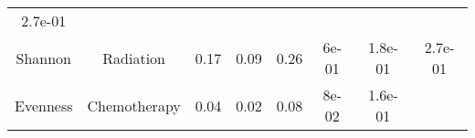 \documentclass[12pt,]{article}
\begin{document}
\begin{longtable}[]{@{}cccccccc@{}}
\begin{minipage}[t]{0.08\columnwidth}
2.7e-01\strut
\end{minipage}\tabularnewline
\begin{minipage}[t]{0.12\columnwidth}\centering\strut
Shannon\strut
\end{minipage} & \begin{minipage}[t]{0.11\columnwidth}\centering\strut
Radiation\strut
\end{minipage} & \begin{minipage}[t]{0.13\columnwidth}\centering\strut
0.17\strut
\end{minipage} & \begin{minipage}[t]{0.08\columnwidth}\centering\strut
0.09\strut
\end{minipage} & \begin{minipage}[t]{0.13\columnwidth}\centering\strut
0.26\strut
\end{minipage} & \begin{minipage}[t]{0.07\columnwidth}\centering\strut
6e-01\strut
\end{minipage} & \begin{minipage}[t]{0.06\columnwidth}\centering\strut
1.8e-01\strut
\end{minipage} & \begin{minipage}[t]{0.08\columnwidth}\centering\strut
2.7e-01\strut
\end{minipage}\tabularnewline
\begin{minipage}[t]{0.12\columnwidth}\centering\strut
Evenness\strut
\end{minipage} & \begin{minipage}[t]{0.11\columnwidth}\centering\strut
Chemotherapy\strut
\end{minipage} & \begin{minipage}[t]{0.13\columnwidth}\centering\strut
0.04\strut
\end{minipage} & \begin{minipage}[t]{0.08\columnwidth}\centering\strut
0.02\strut
\end{minipage} & \begin{minipage}[t]{0.13\columnwidth}\centering\strut
0.08\strut
\end{minipage} & \begin{minipage}[t]{0.07\columnwidth}\centering\strut
8e-02\strut
\end{minipage} & \begin{minipage}[t]{0.06\columnwidth}\centering\strut
1.6e-01\strut
\end{minipage} & \begin{minipage}[t]{0.08\columnwidth}\centering\strut

\end{minipage}
\end{longtable}
\end{document}

